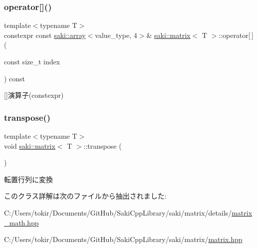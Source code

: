 \subsubsection{\texorpdfstring{operator[]()}{operator[]()}\hspace{0.1cm}{\footnotesize\ttfamily [2/2]}}
{\footnotesize\ttfamily template$<$typename T$>$ \\
constexpr const \mbox{\hyperlink{classsaki_1_1array}{saki\+::array}}$<$value\+\_\+type, 4$>$\& \mbox{\hyperlink{classsaki_1_1matrix}{saki\+::matrix}}$<$ T $>$\+::operator\mbox{[}$\,$\mbox{]} (\begin{DoxyParamCaption}\item[{const size\+\_\+t}]{index }\end{DoxyParamCaption}) const\hspace{0.3cm}{\ttfamily [inline]}}



\mbox{[}\mbox{]}演算子(constexpr) 

\mbox{\label{classsaki_1_1matrix_a95e01e24e45757c1e45b5af25273a8fa}} 
\subsubsection{\texorpdfstring{transpose()}{transpose()}}
{\footnotesize\ttfamily template$<$typename T$>$ \\
void \mbox{\hyperlink{classsaki_1_1matrix}{saki\+::matrix}}$<$ T $>$\+::transpose (\begin{DoxyParamCaption}{ }\end{DoxyParamCaption})\hspace{0.3cm}{\ttfamily [inline]}}



転置行列に変換 



このクラス詳解は次のファイルから抽出されました\+:\begin{DoxyCompactItemize}
\item 
C\+:/\+Users/tokir/\+Documents/\+Git\+Hub/\+Saki\+Cpp\+Library/saki/matrix/details/\mbox{\hyperlink{matrix__math_8hpp}{matrix\+\_\+math.\+hpp}}\item 
C\+:/\+Users/tokir/\+Documents/\+Git\+Hub/\+Saki\+Cpp\+Library/saki/matrix/\mbox{\hyperlink{matrix_2matrix_8hpp}{matrix.\+hpp}}\end{DoxyCompactItemize}
